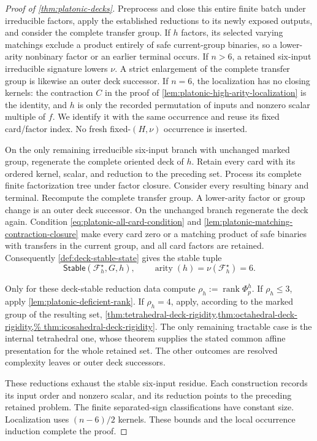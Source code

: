 \documentclass[11pt,letterpaper,onecolumn]{article}
\theoremstyle{plain}
\theoremstyle{definition}
\theoremstyle{remark}
\newcommand{\cF}{\mathcal F}
\newcommand{\Stable}{\mathsf{Stable}}
\newcommand{\rank}{\operatorname{rank}}
\newcommand{\arity}{\operatorname{arity}}
\begin{document}
\begin{proof}[Proof of \cref{thm:platonic-decks}]
Preprocess and close this entire finite batch under irreducible factors, apply the established reductions to its newly
exposed outputs, and consider the complete transfer group.  If \(h\) factors, its
selected varying matchings exclude a product entirely of safe current-group
binaries, so a lower-arity nonbinary factor or an earlier terminal occurs.
If \(n>6\), a retained six-input irreducible signature lowers \(\nu\). A strict
enlargement of the complete transfer group is likewise an outer deck successor.  If \(n=6\),
the localization has no closing kernels: the contraction \(C\) in the
proof of \cref{lem:platonic-high-arity-localization} is the identity, and
\(h\) is only the recorded permutation of inputs and nonzero scalar multiple of
\(f\).  We identify it with the same occurrence and reuse its fixed
card/factor index. No fresh fixed-\((H,\nu)\) occurrence is inserted.

On the only remaining irreducible six-input branch with unchanged marked group,
regenerate the complete oriented deck of \(h\).  Retain every card
with its ordered kernel, scalar, and reduction to the preceding set. Process its complete finite factorization tree under factor closure. Consider every resulting binary and
terminal. Recompute the complete transfer group.  A lower-arity factor or group
change is an outer deck successor.  On the unchanged branch regenerate the deck
again.  Condition \cref{eq:platonic-all-card-condition} and
\cref{lem:platonic-matching-contraction-closure} make every card zero or a
matching product of safe binaries with transfers in the current group, and all card factors are retained.
Consequently \cref{def:deck-stable-state} gives the stable tuple
\[
 \Stable(\cF_h^\star,G,h),
 \qquad \arity(h)=\nu(\cF_h^\star)=6.
\]

Only for these deck-stable reduction data compute \(\rho_h:=\rank\Phi_p^h\).  If \(\rho_h\le3\), apply
\cref{lem:platonic-deficient-rank}.  If \(\rho_h=4\), apply, according to
the marked group of the resulting set,
\cref{thm:tetrahedral-deck-rigidity,thm:octahedral-deck-rigidity,%
thm:icosahedral-deck-rigidity}. The only remaining tractable case is the
internal tetrahedral one, whose theorem supplies the stated common affine
presentation for the whole retained set. The other outcomes are resolved
complexity leaves or outer deck successors.

These reductions exhaust the stable six-input residue. Each construction
records its input order and nonzero scalar, and its
reduction points to the preceding retained problem.  The finite separated-sign classifications have constant size. Localization uses \((n-6)/2\) kernels.  These bounds
and the local occurrence induction complete the proof.
\end{proof}
\end{document}
